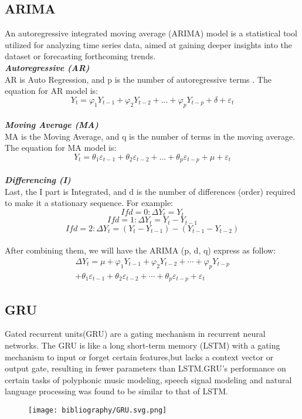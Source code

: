 \documentclass{ieeeojies}
\begin{document}
 \subsection{ARIMA} 
An autoregressive integrated moving average (ARIMA) model is a statistical tool utilized for analyzing time series data, aimed at gaining deeper insights into the dataset or forecasting forthcoming trends. \cite{b8}
\\
\textit{\textbf{Autoregressive (AR)}}
\\
AR is Auto Regression, and p is the number of autoregressive terms . The equation for AR model is: 
\[Y_t = \varphi_1Y_{t-1} + \varphi_2Y_{t-2} + ... + \varphi_pY_{t-p} + \delta + \varepsilon_t\]
\\
\textit{\textbf{Moving Average (MA)}}
\\
MA is the Moving Average, and q is the number of terms in the moving average. The equation for MA model is:  
\[Y_t = \theta_1\varepsilon_{t-1} + \theta_2\varepsilon_{t-2} + ... + \theta_p\varepsilon_{t-p} + \mu + \varepsilon_t\]
\\
\textit{\textbf{Differencing (I) }}
\\
Last, the I part is Integrated, and d is the number of differences (order) required to make it a stationary sequence. For example:
\[If d=0: \Delta Y_t=Y_t\]
\[If d=1: \Delta Y_t=Y_t - Y_{t-1}\]
\[If d=2: \Delta Y_t=\left(Y_t - Y_{t-1}\right) - \left(Y_{t-1} - Y_{t-2}\right)\]
\\
After combining them, we will have the ARIMA (p, d, q) express as follow:
\begin{multline}
\Delta Y_t = \mu + \varphi_1 Y_{t-1} + \varphi_2 Y_{t-2} + \cdots + \varphi_p Y_{t-p} \\
+ \theta_1 \varepsilon_{t-1} + \theta_2 \varepsilon_{t-2} + \cdots + \theta_p \varepsilon_{t-p} + \varepsilon_t
\end{multline}

\subsection{GRU} 
Gated recurrent units(GRU) are a gating mechanism in recurrent neural networks. The GRU is like a long short-term memory (LSTM) with a gating mechanism to input or forget certain features,but lacks a context vector or output gate, resulting in fewer parameters than LSTM.GRU's performance on certain tasks of polyphonic music modeling, speech signal modeling and natural language processing was found to be similar to that of LSTM.
\begin{figure}[H]
    \centering
    \begin{minipage}{0.45\textwidth}
    \centering
    \texttt{[image: bibliography/GRU.svg.png]}    
    \label{fig:1}
    \end{minipage}
\end{figure}
\end{document}
